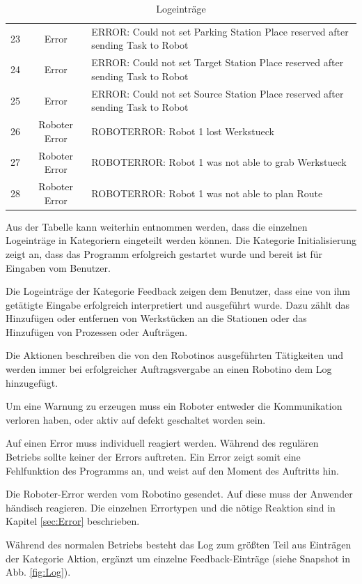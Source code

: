 \begin{table}[!ht]
\begin{tabular}{|c|c|p{10cm}|}
    23 & Error & ERROR: Could not set Parking Station Place reserved after sending Task to Robot \\
    24 & Error & ERROR: Could not set Target Station Place reserved after sending Task to Robot \\
    25 & Error & ERROR: Could not set Source Station Place reserved after sending Task to Robot \\
		\hline
    26 & Roboter Error & ROBOTERROR: Robot 1 lost Werkstueck \\
    27 & Roboter Error & ROBOTERROR: Robot 1 was not able to grab Werkstueck \\
    28 & Roboter Error & ROBOTERROR: Robot 1 was not able to plan Route \\
		\hline
	\end{tabular}
	\caption{Logeinträge}
	\label{tab:Log}
\end{table}

Aus der Tabelle kann weiterhin entnommen werden, dass die einzelnen Logeinträge in Kategoriern eingeteilt werden können. Die Kategorie Initialisierung zeigt an, dass das Programm erfolgreich gestartet wurde und bereit ist für Eingaben vom Benutzer. 

Die Logeinträge der Kategorie Feedback zeigen dem Benutzer, dass eine von ihm getätigte Eingabe erfolgreich interpretiert und ausgeführt wurde. Dazu zählt das Hinzufügen oder entfernen von Werkstücken an die Stationen oder das Hinzufügen von Prozessen oder Aufträgen. 

Die Aktionen beschreiben die von den Robotinos ausgeführten Tätigkeiten und werden immer bei erfolgreicher Auftragsvergabe an einen Robotino dem Log hinzugefügt. 

Um eine Warnung zu erzeugen muss ein Roboter entweder die Kommunikation verloren haben, oder aktiv auf defekt geschaltet worden sein. 

Auf einen Error muss individuell reagiert werden. Während des regulären Betriebs sollte keiner der Errors auftreten. Ein Error zeigt somit eine Fehlfunktion des Programms an, und weist auf den Moment des Auftritts hin.

Die Roboter-Error werden vom Robotino gesendet. Auf diese muss der Anwender händisch reagieren. Die einzelnen Errortypen und die nötige Reaktion sind in Kapitel \ref{sec:Error} beschrieben. 

Während des normalen Betriebs besteht das Log zum größten Teil aus Einträgen der Kategorie Aktion, ergänzt um einzelne Feedback-Einträge (siehe Snapshot in Abb. \ref{fig:Log}).  

